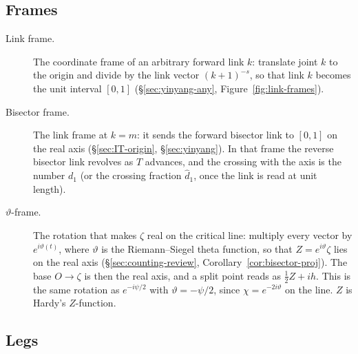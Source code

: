 \documentclass[11pt]{article}
\theoremstyle{definition}
\begin{document}
\subsection*{Frames}

\begin{description}
\item[Link frame.]
The coordinate frame of an arbitrary forward link $k$: translate
joint $k$ to the origin and divide by the link vector $(k+1)^{-s}$,
so that link $k$ becomes the unit interval $[0,1]$
(\S\ref{sec:yinyang-any}, Figure~\ref{fig:link-frames}).

\item[Bisector frame.]
The link frame at $k=m$: it sends the forward bisector link to
$[0,1]$ on the real axis
(\S\ref{sec:IT-origin}, \S\ref{sec:yinyang}).
In that frame the reverse bisector link revolves as $T$ advances,
and the crossing with the axis is the number $d_1$
(or the crossing fraction $\hat d_1$, once the link is read at unit
length).

\item[$\vartheta$-frame.]
The rotation that makes $\zeta$ real on the critical line:
multiply every vector by $e^{i\vartheta(t)}$, where $\vartheta$ is
the Riemann--Siegel theta function, so that
$Z=e^{i\vartheta}\zeta$ lies on the real axis
(\S\ref{sec:counting-review}, Corollary~\ref{cor:bisector-proj}).
The base $O\to\zeta$ is then the real axis, and a split point
reads as $\tfrac12 Z+ih$.
This is the same rotation as $e^{-i\psi/2}$ with
$\vartheta=-\psi/2$, since $\chi=e^{-2i\vartheta}$ on the line.
$Z$ is Hardy's $Z$-function.
\end{description}

\subsection*{Legs}
\end{document}
